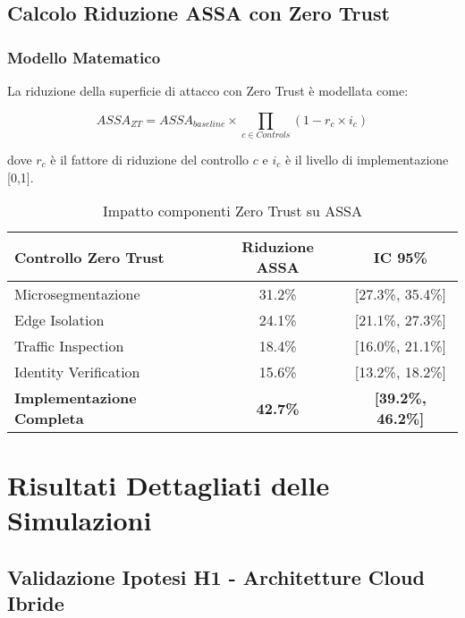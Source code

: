 \section{\texorpdfstring{Calcolo Riduzione ASSA con Zero Trust}{B.3 - Calcolo Riduzione ASSA con Zero Trust}}

\subsection{\texorpdfstring{Modello Matematico}{B.3.1 - Modello Matematico}}

La riduzione della superficie di attacco con Zero Trust è modellata come:

\begin{equation}
ASSA_{ZT} = ASSA_{baseline} \times \prod_{c \in Controls} (1 - r_c \times i_c)
\end{equation}

dove $r_c$ è il fattore di riduzione del controllo $c$ e $i_c$ è il livello di implementazione [0,1].

\begin{table}[htbp]
\centering
\begin{tabular}{lcc}
\toprule
\textbf{Controllo Zero Trust} & \textbf{Riduzione ASSA} & \textbf{IC 95\%} \\
\midrule
Microsegmentazione & 31.2\% & [27.3\%, 35.4\%] \\
Edge Isolation & 24.1\% & [21.1\%, 27.3\%] \\
Traffic Inspection & 18.4\% & [16.0\%, 21.1\%] \\
Identity Verification & 15.6\% & [13.2\%, 18.2\%] \\
\textbf{Implementazione Completa} & \textbf{42.7\%} & \textbf{[39.2\%, 46.2\%]} \\
\bottomrule
\end{tabular}
\caption{Impatto componenti Zero Trust su ASSA}
\end{table}

\chapter{\texorpdfstring{Risultati Dettagliati delle Simulazioni}{Appendice C - Risultati Dettagliati delle Simulazioni}}

\section{\texorpdfstring{Validazione Ipotesi H1 - Architetture Cloud Ibride}{C.1 - Validazione Ipotesi H1 - Architetture Cloud Ibride}}


